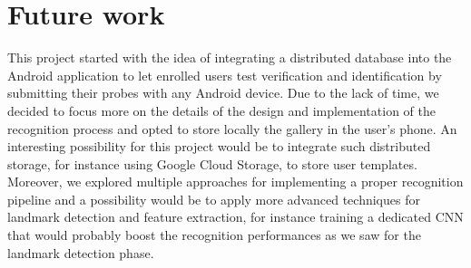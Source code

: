 \documentclass{article}
\begin{document}
\section{Future work}

This project started with the idea of integrating a distributed database into the Android application to let
enrolled users test verification and identification by submitting their probes with any Android device. Due to
the lack of time, we decided to focus more on the details of the design and implementation of the recognition
process and opted to store locally the gallery in the user's phone. An interesting possibility for this project
would be to integrate such distributed storage, for instance using Google Cloud Storage, to store user templates.
Moreover, we explored multiple approaches for implementing a proper recognition pipeline and a possibility would be
to apply more advanced techniques for landmark detection and feature extraction, for instance training a dedicated
CNN that would probably boost the recognition performances as we saw for the landmark detection phase.



\end{document}
